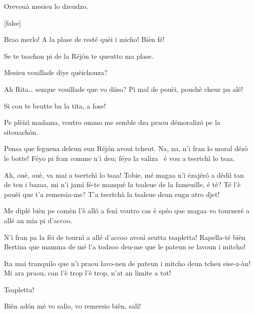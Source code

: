 \begin{drama}
\tcheuttespeaks Orevouà mesieu lo dzeudzo.

[false]




\Eumprezeospeaks Brao merlo! A la plase de resté quèi i micho!  Bièn fé!

\Simonspeaks {} Se te tsachon pi de la Réjón te queutto ma plase.


\Ritaspeaks {} Mesieu vouillade diye quèichouza?

\Tobiespeaks Ah Rita\ldots {} senque vouillade que vo diiso? Pi mal de pouèi, pouchè cheur pa alé!

\Bertinaspeaks Si cou te beutte ba la tita, a fose!

\Ritaspeaks Pe plèizì madama, voutro ommo me semble dza praou démoralizó pe la sitouachón.

\Tobiespeaks Pensa que fegueua deleun eun Réjón avouì tcheut. Na, na, n’i fran lo moral dézò le botte! Féyo pi fran comme n’i deu; féyo la valiza \valigia\ é vou a tsertchì lo tsaa.

\Bertinaspeaks Ah, ouè, ouè, va mai a tsertchì lo tsaa! Tobie, mé magaa n’i ézajéró a dédiì tan de ten i bazaa, mi n’i jamì fé-te manqué la tsaleue de la fameuille, é té? Té l’è pouèi que t’a remersia-me? T’a tsertchà la tsaleue deun eugn atro djet!

\Ritaspeaks Me diplé bièn pe comèn l’è alló a fenì voutro cas è spéo que magaa vo tourneré a allé an mia pi d’accoo.

\Tobiespeaks N’i fran pa la fèi de tournì a allé d’accoo avouì seutta tsapletta! Rapella-té bièn Bertina que mamma de mé l’a todzoo deu-me que le pateun se lavoun i mitcho!

\Bertinaspeaks Ita mai tranquilo que n’i praou lavo-nen de pateun i mi\-tcho deun tcheu sise-z-àn! Mi ara praou, can l’è trop l’è trop, n'at an limite a tot!

\Tobiespeaks Tsapletta!

\Ritaspeaks Bièn ad\'on mé vo salio, vo remersio bièn, salì!


\end{drama}
